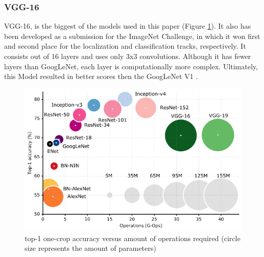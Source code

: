 \documentclass[conference]{IEEEtran}
\begin{document}
\subsubsection{VGG-16}
VGG-16, is the biggest of the models used in this paper (Figure \ref{fig:x mode size}).
It also has been developed as a submission for the ImageNet Challenge, in which it won first and second place for the localization and classification tracks, respectively.
It consists out of 16 layers and uses only 3x3 convolutions. Although it has fewer layers than GoogLeNet, each layer is computationally more complex. Ultimately, this Model resulted in better scores then the GoogLeNet V1 \cite{simonyan_very_2015}.

\begin{figure}[!htbp]
    \centering
    \includegraphics[scale=0.35]{img/model_sizes.png}
    \caption{top-1 one-crop accuracy versus amount of operations required (circle size represents the amount of parameters)}
    \label{fig:x mode size}
\end{figure}
\end{document}
